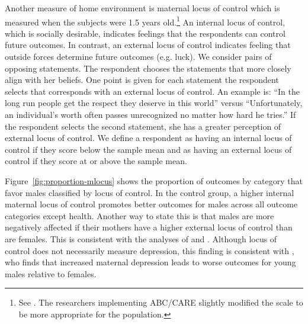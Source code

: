 Another measure of home environment is maternal locus of control which is measured when the subjects were 1.5 years old.\footnote{See \citet{Rotter_1966_PMGaA}. The researchers implementing ABC/CARE slightly modified the scale to be more appropriate for the population.} An internal locus of control, which is socially desirable, indicates feelings that the respondents can control future outcomes. In contrast, an external locus of control indicates feeling that outside forces determine future outcomes (e.g. luck). We consider pairs of opposing statements. The respondent chooses the statements that more closely align with her beliefs. One point is given for each statement the respondent selects that corresponds with an external locus of control. An example is: ``In the long run people get the respect they deserve in this world'' versus ``Unfortunately, an individual's worth often passes unrecognized no matter how hard he tries.'' If the respondent selects the second statement, she has a greater perception of external locus of control.  We define a respondent as having an internal locus of control if they score below the sample mean and as having an external locus of control if they score at or above the sample mean.

Figure~\ref{fig:proportion-mlocus} shows the proportion of outcomes by category that favor males classified by locus of control. In the control group, a higher internal maternal locus of control promotes better outcomes for males across all outcome categories except health. Another way to state this is that males are more negatively affected if their mothers have a higher external locus of control than are females. This is consistent with the analyses of \citet{Schore_2017_IMHJ} and \citet{Golding_Fitzgerald_2017_IMHJ}. Although locus of control does not necessarily measure depression, this finding is consistent with \citet{Beeghly-etal_2017_IMHJ}, who finds that increased maternal depression leads to worse outcomes for young males relative to females.

